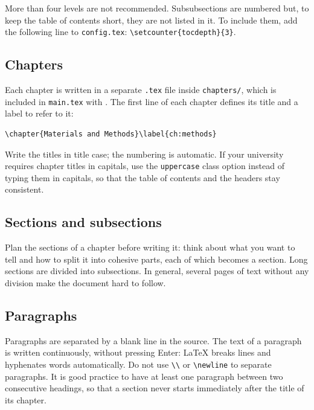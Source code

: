 More than four levels are not recommended. Subsubsections are numbered but, to keep the
table of contents short, they are not listed in it. To include them, add the following line
to \texttt{config.tex}: \verb|\setcounter{tocdepth}{3}|.

\subsection{Chapters}\label{sec:chapters}

Each chapter is written in a separate \texttt{.tex} file inside \texttt{chapters/}, which is
included in \texttt{main.tex} with \verb||. The first line of each
chapter defines its title and a label to refer to it:

\begin{lstlisting}[language={[LaTeX]TeX}, caption={Beginning of a chapter.}, label=lst:chapter]
\chapter{Materials and Methods}\label{ch:methods}
\end{lstlisting}

Write the titles in title case; the numbering is automatic. If your university requires
chapter titles in capitals, use the \texttt{uppercase} class option instead of typing them
in capitals, so that the table of contents and the headers stay consistent.

\subsection{Sections and subsections}\label{sec:sections}

Plan the sections of a chapter before writing it: think about what you want to tell and how
to split it into cohesive parts, each of which becomes a section. Long sections are divided
into subsections. In general, several pages of text without any division make the document
hard to follow.

\subsection{Paragraphs}\label{sec:paragraphs}

Paragraphs are separated by a blank line in the source. The text of a paragraph is written
continuously, without pressing Enter: \LaTeX{} breaks lines and hyphenates words
automatically. Do not use \verb|\\| or \verb|\newline| to separate paragraphs. It is good
practice to have at least one paragraph between two consecutive headings, so that a section
never starts immediately after the title of its chapter.

